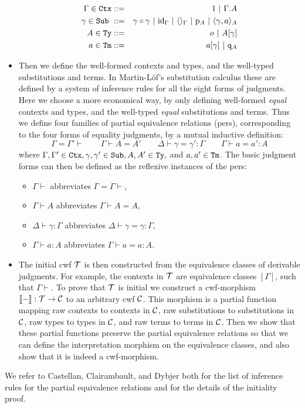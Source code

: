 \documentclass{lmcs}
\def\id{\mathrm{id}}
\begin{document}
\begin{itemize}
\begin{eqnarray*}
\Gamma \in \RawCtx &::=& 1  \ |\ \Gamma\cext A\\
\gamma \in \RawSub \ &::=& \gamma \circ \gamma \ |\ \id_\Gamma \ |\ \langle\rangle_\Gamma \ |\ \p_{A} \ |\ \langle \gamma, a \rangle_A\\
A \in \RawTy &::=& o \ |\  A[\gamma]\\
a \in \RawTm &::=& a[\gamma] \ |\ \qI_A
\end{eqnarray*}
\item
Then we define the well-formed contexts and types, and the well-typed
substitutions and terms. In Martin-L\"of's substitution calculus these are defined by a system of inference rules for all the eight forms of judgments. Here we choose a more economical way, by only defining well-formed \emph{equal} contexts and types, and the well-typed \emph{equal} substitutions and terms. Thus we define four families of partial equivalence relations (pers), corresponding to the four forms of equality judgments, by a mutual inductive definition:
$$
\Gamma = \Gamma' \vdash
\qquad
\Gamma \vdash A = A' 
\qquad
\Delta \vdash \gamma = \gamma' : \Gamma
\qquad
\Gamma \vdash a = a' : A
$$
where $\Gamma, \Gamma' \in {\tt Ctx}, \gamma, \gamma' \in {\tt Sub}, A, A' \in {\tt Ty},$ and $a,a' \in {\tt Tm}$. The basic judgment forms can then be defined as the reflexive instances of the pers:
\begin{itemize}
\item 
$\Gamma \vdash$ abbreviates $\Gamma = \Gamma \vdash$, 
\item
$\Gamma \vdash A$ abbreviates $\Gamma \vdash A = A$,
\item
$\Delta \vdash \gamma : \Gamma$ abbreviates  $\Delta \vdash \gamma = \gamma : \Gamma$, 
\item
$\Gamma \vdash a : A$ abbreviates $\Gamma \vdash a = a : A$.
\end{itemize}
\item
The initial cwf ${\mathcal T}$ is then constructed from the equivalence classes of derivable judgments. For example, the contexts in ${\mathcal T}$ are equivalence classes $[\Gamma]$, such that $\Gamma \vdash$. To prove that ${\mathcal T}$ is initial we construct a cwf-morphism $\llbracket - \rrbracket : {\mathcal T} \to {\mathcal C}$ to an arbitrary cwf ${\mathcal C}$. This morphism is a partial function mapping raw contexts to contexts in ${\mathcal C}$, raw substitutions to substitutions in ${\mathcal C}$, raw types to types in ${\mathcal C}$, and raw terms to terms in ${\mathcal C}$. Then we show that these partial functions preserve the partial equivalence relations so that we can define the interpretation morphism on the equivalence classes, and also show that it is indeed a cwf-morphism.
\end{itemize}
We refer to Castellan, Clairambault, and Dybjer \cite{castellan:tlca2015,castellan:lmcs} both for the list of inference rules for the partial equivalence relations and for the details of the initiality proof.
\end{document}
